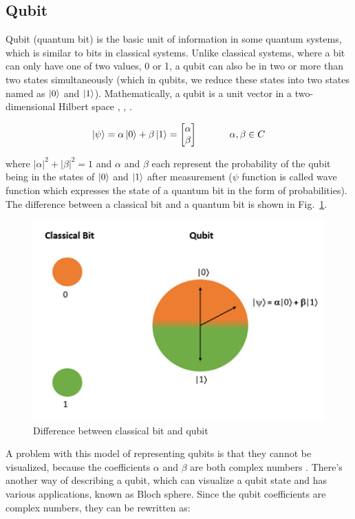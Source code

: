 \documentclass[conference]{IEEEtran}
\begin{document}
\subsection{Qubit}
Qubit (quantum bit) is the basic unit of information in some quantum systems, which is similar to bits in classical systems. Unlike classical systems, where a bit can only have one of two values, 0 or 1, a qubit can also be in two or more than two states simultaneously (which in qubits, we reduce these states into two states named as $\ket{0}$ and $\ket{1}$). Mathematically, a qubit is a unit vector in a two-dimensional Hilbert space \cite{b15}, \cite{b16}, \cite{b19}.

\begin{equation}
	\ket{\psi} = \alpha\ket{0} + \beta\ket{1} = \begin{bmatrix}
		\alpha \\
		\beta
	\end{bmatrix} \ \ \ \ \ \ \ \ \ \ \alpha, \beta \in C \label{eq1}
\end{equation}

where $|\alpha|^{2} +  |\beta|^{2} = 1$ and $\alpha$ and $\beta$ each represent the probability of the qubit being in the states of $\ket{0}$ and $\ket{1}$ after measurement ($\psi$ function is called wave function which expresses the state of a quantum bit in the form of probabilities). The difference between a classical bit and a quantum bit is shown in Fig.~\ref{fig3}.

\begin{figure}[htbp]
	\centerline{\includegraphics{difference.png}}
	\caption{Difference between classical bit and qubit \cite{b13}}
	\label{fig3}
\end{figure}

A problem with this model of representing qubits is that they cannot be visualized, because the coefficients $\alpha$ and $\beta$ are both complex numbers \cite{b20}. There’s another way of describing a qubit, which can visualize a qubit state and has various applications, known as Bloch sphere. Since the qubit coefficients are complex numbers, they can be rewritten as:
\end{document}

